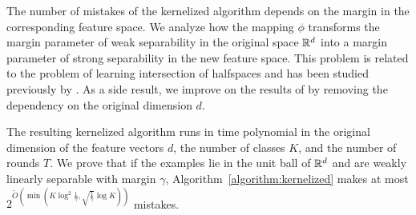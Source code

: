 The number of mistakes of the kernelized algorithm depends on the margin in the
corresponding feature space. We analyze how the mapping $\phi$ transforms the
margin parameter of weak separability in the original space $\mathbb{R}^d$ into a margin
parameter of strong separability in the new feature space. This problem is
related to the problem of learning intersection of halfspaces and has been
studied previously by \citet{Klivans-Servedio-2008}. As a side result, we
improve on the results of \citet{Klivans-Servedio-2008} by removing the
dependency on the original dimension $d$.

The resulting kernelized algorithm runs in time polynomial in the
original dimension of the feature vectors $d$, the number of classes $K$, and
the number of rounds $T$. We prove that if the examples lie in the unit ball of
$\mathbb{R}^d$ and are weakly linearly separable with margin $\gamma$,
Algorithm~\ref{algorithm:kernelized} makes at
most $2^{\widetilde{O}(\min(K \log^2 \frac{1}{\gamma}, \sqrt{\frac{1}{\gamma}}
\log K))}$ mistakes.
